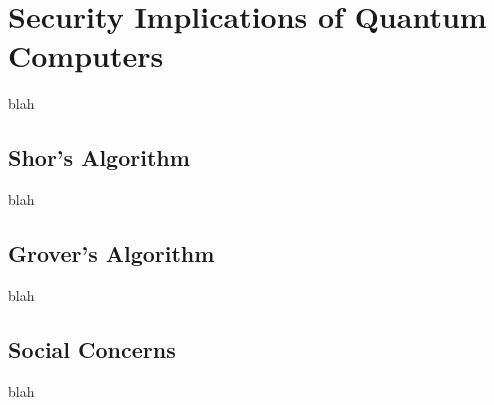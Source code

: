\section{Security Implications of Quantum Computers}
blah

\subsection{Shor's Algorithm}
blah

\subsection{Grover's Algorithm}
blah

\subsection{Social Concerns}
blah